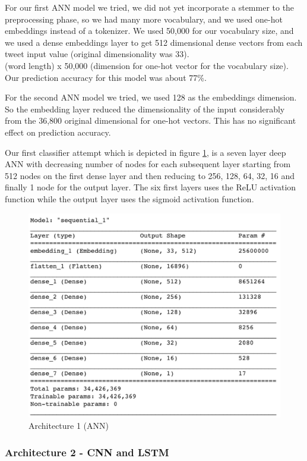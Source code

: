 \documentclass[conference]{sig-alternate-05-2015}
\begin{document}
For our first ANN model we tried, we did not yet incorporate a stemmer to the preprocessing phase, so we had many more vocabulary, and we used one-hot embeddings instead of a tokenizer. We used 50,000 for our vocabulary size, and we used a dense embeddings layer to get 512 dimensional dense vectors from each tweet input value (original dimensionality was 33).\\ (word length) x 50,000 (dimension for one-hot vector for the vocabulary size). Our prediction accuracy for this model was about 77\%.

For the second ANN model we tried, we used 128 as the embeddings dimension. So the  embedding layer reduced the dimensionality of the input considerably from the 36,800 original dimensional for one-hot vectors. This has no significant effect on prediction accuracy.



Our first classifier attempt which is depicted in figure \ref{fig:model ANN}, is a seven layer deep ANN with decreasing number of nodes for each subsequent layer starting from 512 nodes on the first dense layer and then reducing to 256, 128, 64, 32, 16 and finally 1 node for the output layer. The six first layers uses the ReLU activation function while the output layer uses the sigmoid activation function.

\begin{figure}
	\centering
	\includegraphics[width=0.8\linewidth]{"Model_ANN"}
	\caption{Architecture 1 (ANN)}
	\label{fig:model ANN}
\end{figure}

\subsubsection{Architecture 2 - CNN and LSTM}
\end{document}
